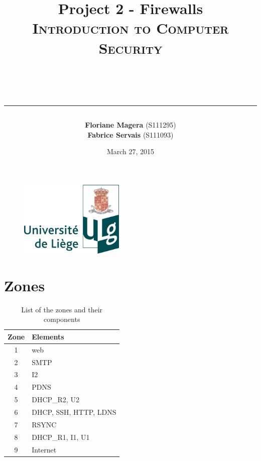 \documentclass[a4paper,titlepage]{article}
\begin{document}
\begin{titlepage}

\begin{figure}
\centering
\includegraphics[width=5cm]{logo-ulg.png}
\end{figure}



\title{
\vspace{0.2cm}
\LARGE{\textbf{Project 2 - Firewalls}} \\ \textsc{Introduction to Computer Security}
\author{\textbf{Floriane Magera} \small{(S111295})\\\textbf{Fabrice Servais} \small{(S111093})}\\
\date{March 27, 2015}
\rule{15cm}{1.5pt}
}

\end{titlepage}

\pagestyle{fancy}

\maketitle

\section{Zones}
\label{sec:Zones}

\begin{table}[h]
	\center
	\begin{tabular}{c|l}
		Zone & Elements\\
		\hline
		1 & web\\
		2 & SMTP\\
		3 & I2\\
		4 & PDNS\\
		5 & DHCP\_R2, U2\\
		6 & DHCP, SSH, HTTP, LDNS\\
		7 & RSYNC\\
		8 & DHCP\_R1, I1, U1\\
		9 & Internet\\
	\end{tabular}
	\caption{List of the zones and their components}
\end{table}
\end{document}
